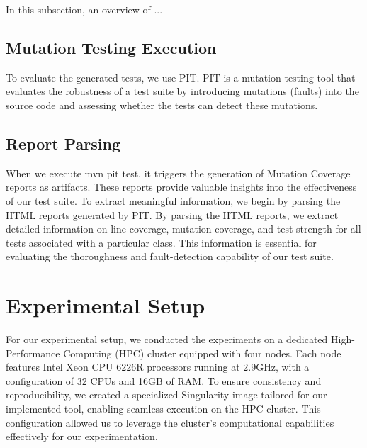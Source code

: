 In this subsection, an overview of ...

\vspace{0.1 cm}
\subsection{Mutation Testing Execution}
\label{sec:mutation_testing_execution}
\vspace{0.1 cm}

To evaluate the generated tests, we use PIT\cite{noauthor_pit_nodate}. PIT is a mutation testing tool that evaluates the robustness of a test suite by introducing mutations (faults) into the source code and assessing whether the tests can detect these mutations.

\vspace{0.1 cm}
\subsection{Report Parsing}
\label{sec:report_parsing}
\vspace{0.1 cm}

When we execute mvn pit test, it triggers the generation of Mutation Coverage reports as artifacts. These reports provide valuable insights into the effectiveness of our test suite. To extract meaningful information, we begin by parsing the HTML reports generated by PIT. By parsing the HTML reports, we extract detailed information on line coverage, mutation coverage, and test strength for all tests associated with a particular class. This information is essential for evaluating the thoroughness and fault-detection capability of our test suite.

\section{Experimental Setup}
\label{sec:experimental_setup}
\vspace{0.2 cm}

For our experimental setup, we conducted the experiments on a dedicated High-Performance Computing (HPC) cluster equipped with four nodes. Each node features Intel Xeon CPU 6226R\cite{noauthor_intel_nodate} processors running at 2.9GHz, with a configuration of 32 CPUs and 16GB of RAM. To ensure consistency and reproducibility, we created a specialized Singularity\cite{noauthor_introduction_nodate} image tailored for our implemented tool, enabling seamless execution on the HPC cluster. This configuration allowed us to leverage the cluster's computational capabilities effectively for our experimentation.

